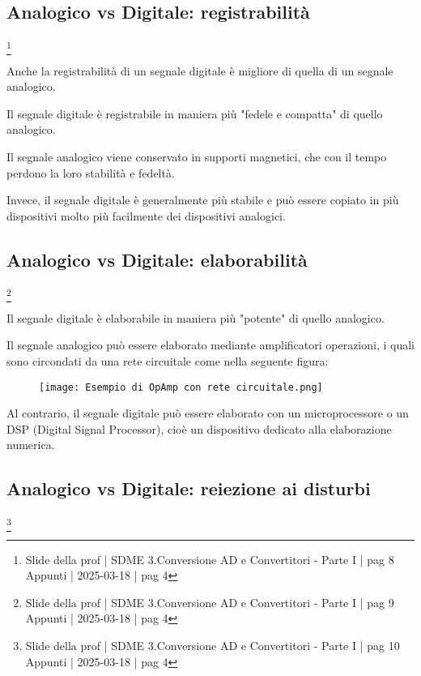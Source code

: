 \subsection{Analogico vs Digitale: registrabilità}
\footnote{Slide della prof | SDME 3.Conversione AD e Convertitori - Parte I | pag 8 \\  
Appunti | 2025-03-18 | pag 4}

Anche la registrabilità di un segnale digitale è migliore di quella di un segnale analogico. \newline 

Il segnale digitale è registrabile in maniera più "fedele e compatta" di quello analogico. \newline 

Il segnale analogico viene conservato in supporti magnetici, che con il tempo perdono la loro stabilità e fedeltà. \newline 

Invece, il segnale digitale è generalmente più stabile e può essere copiato in più dispositivi molto più facilmente 
dei dispositivi analogici. \newline 

\subsection{Analogico vs Digitale: elaborabilità}
\footnote{Slide della prof | SDME 3.Conversione AD e Convertitori - Parte I | pag 9 \\  
Appunti | 2025-03-18 | pag 4 }

Il segnale digitale è elaborabile in maniera più "potente" di quello analogico. \newline 

Il segnale analogico può essere elaborato mediante amplificatori operazioni, i quali sono circondati da una rete circuitale 
come nella seguente figura: 

\begin{figure}[h]
    \centering
    \texttt{[image: Esempio di OpAmp con rete circuitale.png]}
\end{figure}

Al contrario, il segnale digitale può essere elaborato con un microprocessore o un DSP (Digital Signal Processor), 
cioè un dispositivo dedicato alla elaborazione numerica. \newline 

\subsection{Analogico vs Digitale: reiezione ai disturbi}
\footnote{Slide della prof | SDME 3.Conversione AD e Convertitori - Parte I | pag 10 \\  
Appunti | 2025-03-18 | pag 4}

